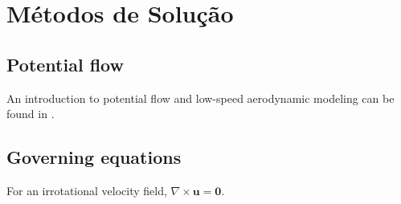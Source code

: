 \chapter{Métodos de Solução}
\ChapterTOC

\section{Potential flow}
An introduction to potential flow and low-speed aerodynamic modeling can be found in \cite{katz2001}.

\section{Governing equations}
For an irrotational velocity field, $\nabla\times\mathbf{u}=\mathbf{0}$.

\ChapterReferences
